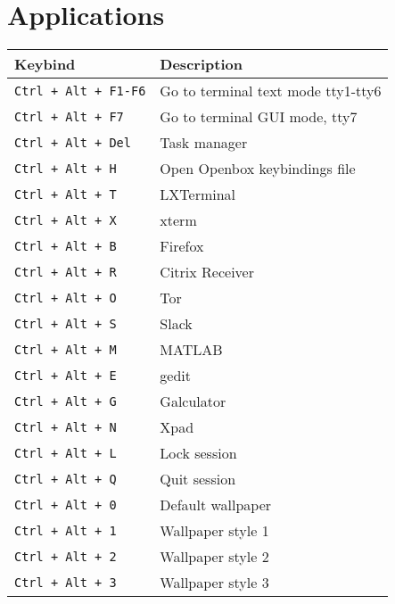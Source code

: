 \documentclass[letterpaper,12pt]{article}
\begin{document}
\section*{Applications}
\begin{table}[H]
  \begin{tabular}{|C{5cm}|L{10cm}|}
    \hline
    \textbf{Keybind} & \textbf{Description} \\
    \hline
    {\tt Ctrl + Alt + F1-F6} & Go to terminal text mode tty1-tty6 \\
    {\tt Ctrl + Alt + F7} & Go to terminal GUI mode, tty7 \\
    {\tt Ctrl + Alt + Del} & Task manager \\
    {\tt Ctrl + Alt + H} & Open Openbox keybindings file\\
    {\tt Ctrl + Alt + T} & LXTerminal \\
    {\tt Ctrl + Alt + X} & xterm \\
    {\tt Ctrl + Alt + B} & Firefox \\
    {\tt Ctrl + Alt + R} & Citrix Receiver \\
    {\tt Ctrl + Alt + O} & Tor \\
    {\tt Ctrl + Alt + S} & Slack \\
    {\tt Ctrl + Alt + M} & MATLAB \\
    {\tt Ctrl + Alt + E} & gedit \\
    {\tt Ctrl + Alt + G} & Galculator \\
    {\tt Ctrl + Alt + N} & Xpad \\
    {\tt Ctrl + Alt + L} & Lock session \\
    {\tt Ctrl + Alt + Q} & Quit session \\
    {\tt Ctrl + Alt + 0} & Default wallpaper \\
    {\tt Ctrl + Alt + 1} & Wallpaper style 1 \\
    {\tt Ctrl + Alt + 2} & Wallpaper style 2 \\
    {\tt Ctrl + Alt + 3} & Wallpaper style 3 \\
    \hline
  \end{tabular}
\end{table}


\end{document}
